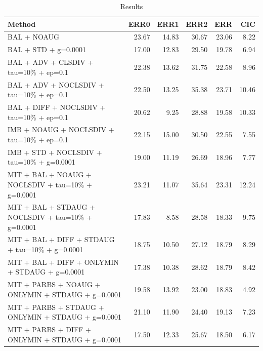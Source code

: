 \begin{table}
\caption{Results}
\label{tab:Results}
\begin{tabular}{lrrrrr}
\toprule
Method & ERR0 & ERR1 & ERR2 & ERR & CIC \\
\midrule
BAL + NOAUG & 23.67 & 14.83 & 30.67 & 23.06 & 8.22 \\
BAL + STD + g=0.0001 & 17.00 & 12.83 & 29.50 & 19.78 & 6.94 \\
BAL + ADV + CLSDIV + tau=10\% + ep=0.1 & 22.38 & 13.62 & 31.75 & 22.58 & 8.96 \\
BAL + ADV + NOCLSDIV + tau=10\% + ep=0.1 & 22.50 & 13.25 & 35.38 & 23.71 & 10.46 \\
BAL + DIFF + NOCLSDIV + tau=10\% + ep=0.1 & 20.62 & 9.25 & 28.88 & 19.58 & 10.33 \\
IMB + NOAUG + NOCLSDIV + tau=10\% + ep=0.1 & 22.15 & 15.00 & 30.50 & 22.55 & 7.55 \\
IMB + STD + NOCLSDIV + tau=10\% + g=0.0001 & 19.00 & 11.19 & 26.69 & 18.96 & 7.77 \\
MIT + BAL + NOAUG + NOCLSDIV + tau=10\% + g=0.0001 & 23.21 & 11.07 & 35.64 & 23.31 & 12.24 \\
MIT + BAL + STDAUG + NOCLSDIV + tau=10\% + g=0.0001 & 17.83 & 8.58 & 28.58 & 18.33 & 9.75 \\
MIT + BAL + DIFF + STDAUG + tau=10\% + g=0.0001 & 18.75 & 10.50 & 27.12 & 18.79 & 8.29 \\
MIT + BAL + DIFF + ONLYMIN + STDAUG + g=0.0001 & 17.38 & 10.38 & 28.62 & 18.79 & 8.42 \\
MIT + PARBS + NOAUG + ONLYMIN + STDAUG + g=0.0001 & 19.58 & 13.92 & 23.00 & 18.83 & 4.92 \\
MIT + PARBS + STDAUG + ONLYMIN + STDAUG + g=0.0001 & 21.10 & 11.90 & 24.40 & 19.13 & 7.23 \\
MIT + PARBS + DIFF + ONLYMIN + STDAUG + g=0.0001 & 17.50 & 12.33 & 25.67 & 18.50 & 6.17 \\
\bottomrule
\end{tabular}
\end{table}
